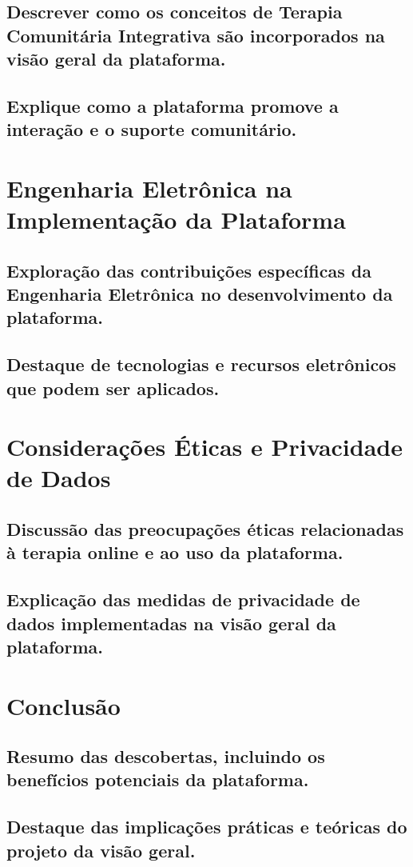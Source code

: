 \subsection{Descrever como os conceitos de Terapia Comunitária Integrativa são incorporados na visão geral da plataforma.}
\subsection{Explique como a plataforma promove a interação e o suporte comunitário.}
\section{Engenharia Eletrônica na Implementação da Plataforma}
\subsection{Exploração das contribuições específicas da Engenharia Eletrônica no desenvolvimento da plataforma.}
\subsection{Destaque de tecnologias e recursos eletrônicos que podem ser aplicados.}

\section{Considerações Éticas e Privacidade de Dados}
\subsection{Discussão das preocupações éticas relacionadas à terapia online e ao uso da plataforma.}
\subsection{Explicação das medidas de privacidade de dados implementadas na visão geral da plataforma.}
\section{Conclusão}
\subsection{Resumo das descobertas, incluindo os benefícios potenciais da plataforma.}
\subsection{Destaque das implicações práticas e teóricas do projeto da visão geral.}
